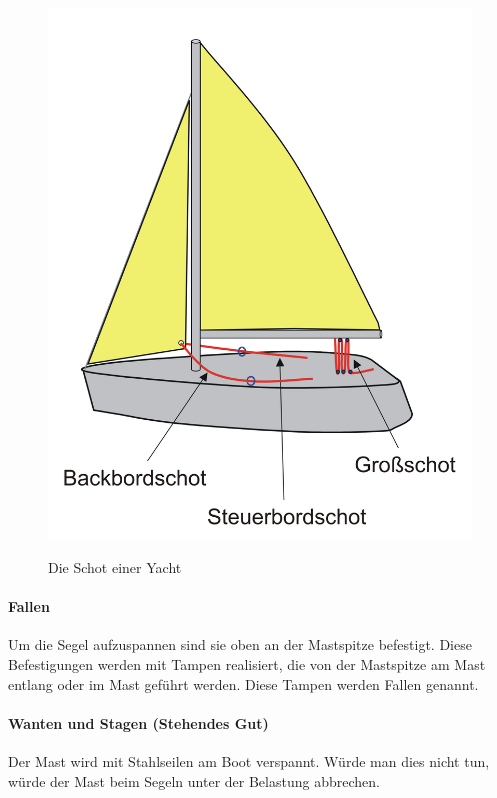 \documentclass[12pt]{article}
\begin{document}
\begin{figure}[h!]
\begin{center}
\label{schoten}
\includegraphics[scale=0.4]{bilder/schoten.png}
\end{center}
\caption{Die Schot einer Yacht}
\end{figure}

\paragraph{Fallen}
Um die Segel aufzuspannen sind sie oben an der Mastspitze befestigt. Diese Befestigungen werden mit Tampen realisiert, die von der Mastspitze am Mast entlang oder im Mast geführt werden. Diese Tampen werden Fallen genannt.

\paragraph{Wanten und Stagen (Stehendes Gut)}
Der Mast wird mit Stahlseilen am Boot verspannt. Würde man dies nicht tun, würde der Mast beim Segeln unter der Belastung abbrechen.
\end{document}
